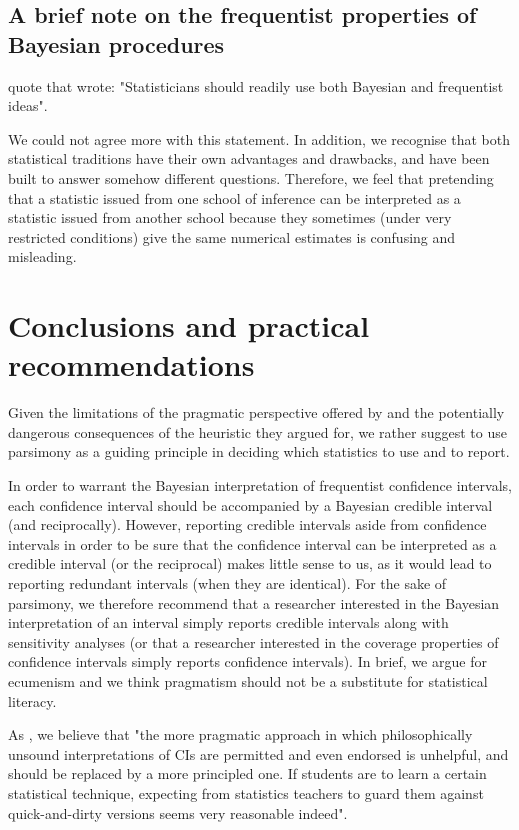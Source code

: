 \documentclass[a4paper,man,natbib,floatsintext,donotrepeattitle]{apa6}
\begin{document}
\subsection{A brief note on the frequentist properties of Bayesian procedures}

\cite{albers_credible_2018} quote \cite{bayarri_interplay_2004} that wrote: "Statisticians should readily use both Bayesian and frequentist ideas".

We could not agree more with this statement. In addition, we recognise that both statistical traditions have their own advantages and drawbacks, and have been built to answer somehow different questions. Therefore, we feel that pretending that a statistic issued from one school of inference can be interpreted as a statistic issued from another school because they sometimes (under very restricted conditions) give the same numerical estimates is confusing and misleading.

\section{Conclusions and practical recommendations}

Given the limitations of the pragmatic perspective offered by \cite{albers_credible_2018} and the potentially dangerous consequences of the heuristic they argued for, we rather suggest to use parsimony as a guiding principle in deciding which statistics to use and to report.

In order to warrant the Bayesian interpretation of frequentist confidence intervals, each confidence interval should be accompanied by a Bayesian credible interval (and reciprocally). However, reporting credible intervals aside from confidence intervals in order to be sure that the confidence interval can be interpreted as a credible interval (or the reciprocal) makes little sense to us, as it would lead to reporting redundant intervals (when they are identical). For the sake of parsimony, we therefore recommend that a researcher interested in the Bayesian interpretation of an interval simply reports credible intervals along with sensitivity analyses (or that a researcher interested in the coverage properties of confidence intervals simply reports confidence intervals). In brief, we argue for ecumenism and we think pragmatism should not be a substitute for statistical literacy. 

As \cite{hoekstra_improving_2018}, we believe that "the more pragmatic approach in which philosophically unsound interpretations of CIs are permitted and even endorsed is unhelpful, and should be replaced by a more principled one. If students are to learn a certain statistical technique, expecting from statistics teachers to guard them against quick-and-dirty versions seems very reasonable indeed".
\end{document}

